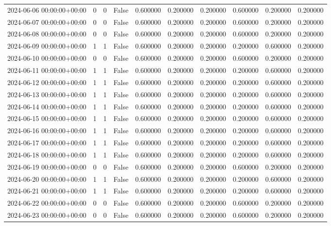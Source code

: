 \begin{tabular}{lrrrrrrrrr}
2024-06-06 00:00:00+00:00 & 0 & 0 & False & 0.600000 & 0.200000 & 0.200000 & 0.600000 & 0.200000 & 0.200000 \\
2024-06-07 00:00:00+00:00 & 0 & 0 & False & 0.600000 & 0.200000 & 0.200000 & 0.600000 & 0.200000 & 0.200000 \\
2024-06-08 00:00:00+00:00 & 0 & 0 & False & 0.600000 & 0.200000 & 0.200000 & 0.600000 & 0.200000 & 0.200000 \\
2024-06-09 00:00:00+00:00 & 1 & 1 & False & 0.600000 & 0.200000 & 0.200000 & 0.200000 & 0.600000 & 0.200000 \\
2024-06-10 00:00:00+00:00 & 0 & 0 & False & 0.600000 & 0.200000 & 0.200000 & 0.600000 & 0.200000 & 0.200000 \\
2024-06-11 00:00:00+00:00 & 1 & 1 & False & 0.600000 & 0.200000 & 0.200000 & 0.200000 & 0.600000 & 0.200000 \\
2024-06-12 00:00:00+00:00 & 1 & 1 & False & 0.600000 & 0.200000 & 0.200000 & 0.200000 & 0.600000 & 0.200000 \\
2024-06-13 00:00:00+00:00 & 1 & 1 & False & 0.600000 & 0.200000 & 0.200000 & 0.200000 & 0.600000 & 0.200000 \\
2024-06-14 00:00:00+00:00 & 1 & 1 & False & 0.600000 & 0.200000 & 0.200000 & 0.200000 & 0.600000 & 0.200000 \\
2024-06-15 00:00:00+00:00 & 1 & 1 & False & 0.600000 & 0.200000 & 0.200000 & 0.200000 & 0.600000 & 0.200000 \\
2024-06-16 00:00:00+00:00 & 1 & 1 & False & 0.600000 & 0.200000 & 0.200000 & 0.200000 & 0.600000 & 0.200000 \\
2024-06-17 00:00:00+00:00 & 1 & 1 & False & 0.600000 & 0.200000 & 0.200000 & 0.200000 & 0.600000 & 0.200000 \\
2024-06-18 00:00:00+00:00 & 1 & 1 & False & 0.600000 & 0.200000 & 0.200000 & 0.200000 & 0.600000 & 0.200000 \\
2024-06-19 00:00:00+00:00 & 0 & 0 & False & 0.600000 & 0.200000 & 0.200000 & 0.600000 & 0.200000 & 0.200000 \\
2024-06-20 00:00:00+00:00 & 1 & 1 & False & 0.600000 & 0.200000 & 0.200000 & 0.200000 & 0.600000 & 0.200000 \\
2024-06-21 00:00:00+00:00 & 1 & 1 & False & 0.600000 & 0.200000 & 0.200000 & 0.200000 & 0.600000 & 0.200000 \\
2024-06-22 00:00:00+00:00 & 0 & 0 & False & 0.600000 & 0.200000 & 0.200000 & 0.600000 & 0.200000 & 0.200000 \\
2024-06-23 00:00:00+00:00 & 0 & 0 & False & 0.600000 & 0.200000 & 0.200000 & 0.600000 & 0.200000 & 0.200000 \\

\end{tabular}
